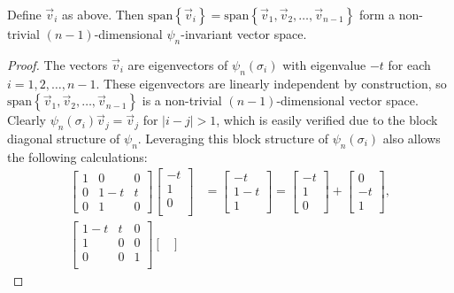 \begin{proposition}
    Define $\vec{v}_i$ as above. Then $\textrm{span}\left\{ \vec{v}_i \right\} = \textrm{span}\left\{\vec{v}_1,\vec{v}_2,\dots,\vec{v}_{n-1}\right\}$ form a non-trivial $(n-1)$-dimensional $\psi_n$-invariant vector space.
\end{proposition}
\begin{proof}
    The vectors $\vec{v}_i$ are eigenvectors of $\psi_n(\sigma_i)$ with eigenvalue $-t$ for each $i=1,2,\dots,n-1$. These eigenvectors are linearly independent by construction, so $\textrm{span}\left\{ \vec{v}_1,\vec{v}_2,\dots,\vec{v}_{n-1} \right\}$ is a non-trivial $(n-1)$-dimensional vector space. Clearly $\psi_n(\sigma_i)\vec{v}_j = \vec{v}_j$ for $|i-j|>1$, which is easily verified due to the block diagonal structure of $\psi_n$. Leveraging this block structure of $\psi_n(\sigma_i)$ also allows the following calculations:
    \begin{align}
        \begin{bmatrix}
            1 & 0 & 0 \\
            0 & 1-t & t \\
            0 & 1 & 0
        \end{bmatrix}\begin{bmatrix}
            -t \\ 1 \\ 0 \\
        \end{bmatrix} &= \begin{bmatrix}
            -t \\ 1-t \\ 1
        \end{bmatrix} = \begin{bmatrix}
            -t \\ 1 \\ 0
        \end{bmatrix} + \begin{bmatrix}
            0 \\ -t \\ 1
        \end{bmatrix}, \\
        \begin{bmatrix}
            1-t & t & 0\\
            1 & 0 & 0 \\
            0 & 0 & 1 \\
        \end{bmatrix}\begin{bmatrix}

\end{bmatrix}
\end{align}
\end{proof}

